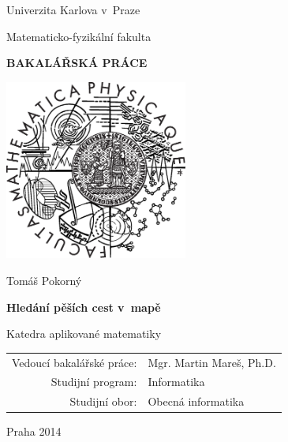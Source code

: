 \documentclass[12pt,a4paper]{report}
\begin{document}


\pagestyle{empty}
\begin{center}

\large

Univerzita Karlova v~Praze

\medskip

Matematicko-fyzikální fakulta

\vfill

{\bf\Large BAKALÁŘSKÁ PRÁCE}

\vfill

\centerline{\mbox{\includegraphics[width=60mm]{../img/logo.eps}}}

\vfill
\vspace{5mm}

{\LARGE Tomáš Pokorný}

\vspace{15mm}

{\LARGE\bfseries Hledání pěších cest v~mapě}

\vfill

Katedra aplikované matematiky

\vfill

\begin{tabular}{rl}

Vedoucí bakalářské práce: & Mgr. Martin Mareš, Ph.D. \\
\noalign{\vspace{2mm}}
Studijní program: & Informatika \\
\noalign{\vspace{2mm}}
Studijní obor: & Obecná informatika \\
\end{tabular}

\vfill

Praha 2014

\end{center}
\end{document}
